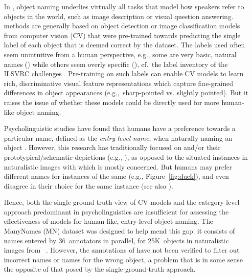 In \lv, object naming underlies virtually all tasks that model how speakers refer to objects in the world, such as image description or visual question answering.
\lv methods are generally based on object detection or image classification models from computer vision (CV) that were pre-trained towards predicting the single label of each object that is deemed correct by the dataset.
The labels used often seem unintuitive from a human perspective, e.g., some are very basic, natural names () while others seem overly specific (), cf.\ the label inventory of the ILSVRC challenges \cite{ILSVRC15}.
Pre-training on such labels can enable CV models to learn rich, discriminative visual feature representations which capture fine-grained differences in object appearances (e.g.,\ sharp-pointed vs. slightly pointed). 
But it raises the issue of whether these models could be directly used for more human-like object naming.

Psycholinguistic studies have found that humans have a preference towards a particular name, defined as the \textit{entry-level name}, when naturally naming an object \cite{rosch1976basic,Rosch1978,jolicoeur1984pictures}. 
However, this research has traditionally focused on \categories and/or their prototypical/schematic depictions (e.g., \citealt{rossion2004revisiting}), as opposed to the situated instances in naturalistic images with which \lv is mostly concerned.
But humans may prefer different names for instances of the same \category (e.g., Figure~\ref{fig:duck}), and even disagree in their choice for the same instance (see also \citealt{graf2016animal}).

Hence, both the single-ground-truth view of CV models and the category-level approach predominant in psycholinguistics are insufficient for assessing the effectiveness of \lv models for human-like, entry-level object naming.
The ManyNames (MN) dataset was designed to help mend this gap: it consists of names entered by 36~annotators in parallel, for 25K~objects in naturalistic images from \vg~\cite{krishna2016visualgenome}.
However, the annotations of \mn have not been verified to filter out incorrect names or names for the wrong object, a problem that is in some sense the opposite of that posed by the single-ground-truth approach.

